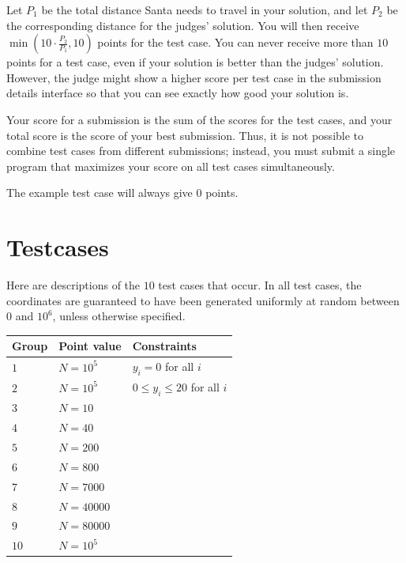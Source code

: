Let $P_1$ be the total distance Santa needs to travel in your solution, and let $P_2$ be the corresponding
distance for the judges' solution. You will then receive $\min(10 \cdot \frac{P_2}{P_1}, 10)$ points for the test case.
You can never receive more than $10$ points for a test case, even if your solution is better than the judges' solution.
However, the judge might show a higher score per test case in the submission details interface so that you can see exactly
how good your solution is.

Your score for a submission is the sum of the scores for the test cases, and your total score is the score of your best
submission. Thus, it is not possible to combine test cases from different submissions; instead, you must submit a
single program that maximizes your score on all test cases simultaneously.

The example test case will always give $0$ points.

\section*{Testcases}
Here are descriptions of the $10$ test cases that occur. In all test cases, the coordinates are guaranteed to have been
generated uniformly at random between $0$ and $10^6$, unless otherwise specified.

\noindent
\begin{tabular}{| l | l | p{12cm} |}
  \hline
  \textbf{Group} & \textbf{Point value} & \textbf{Constraints} \\ \hline
  $1$       & $N = 10^5$                                 & $y_i = 0$ for all $i$  \\ \hline
  $2$       & $N = 10^5$                                 & $0 \leq y_i \leq 20$ for all $i$   \\ \hline
  $3$       & $N = 10$                                   &    \\ \hline
  $4$       & $N = 40$                                   &   \\ \hline
  $5$       & $N = 200$                                   &    \\ \hline
  $6$       & $N = 800$                                   &    \\ \hline
  $7$       & $N = 7000$                                   &    \\ \hline
  $8$       & $N = 40000$                                   &   \\ \hline
  $9$       & $N = 80000$                                   &    \\ \hline
  $10$      & $N = 10^5$                                   &    \\ \hline
\end{tabular}

